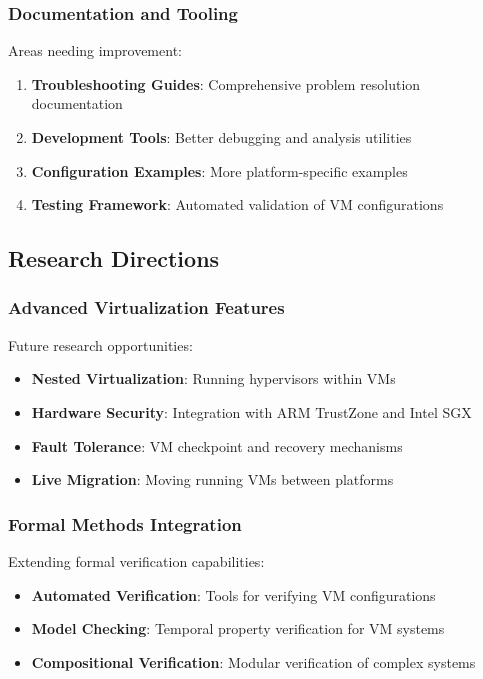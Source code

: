 \documentclass[11pt,a4paper]{article}
\begin{document}
\subsubsection{Documentation and Tooling}

Areas needing improvement:

\begin{enumerate}
\item \textbf{Troubleshooting Guides}: Comprehensive problem resolution documentation
\item \textbf{Development Tools}: Better debugging and analysis utilities
\item \textbf{Configuration Examples}: More platform-specific examples
\item \textbf{Testing Framework}: Automated validation of VM configurations
\end{enumerate}

\subsection{Research Directions}

\subsubsection{Advanced Virtualization Features}

Future research opportunities:

\begin{itemize}
\item \textbf{Nested Virtualization}: Running hypervisors within VMs
\item \textbf{Hardware Security}: Integration with ARM TrustZone and Intel SGX
\item \textbf{Fault Tolerance}: VM checkpoint and recovery mechanisms
\item \textbf{Live Migration}: Moving running VMs between platforms
\end{itemize}

\subsubsection{Formal Methods Integration}

Extending formal verification capabilities:

\begin{itemize}
\item \textbf{Automated Verification}: Tools for verifying VM configurations
\item \textbf{Model Checking}: Temporal property verification for VM systems
\item \textbf{Compositional Verification}: Modular verification of complex systems
\end{itemize}
\end{document}
